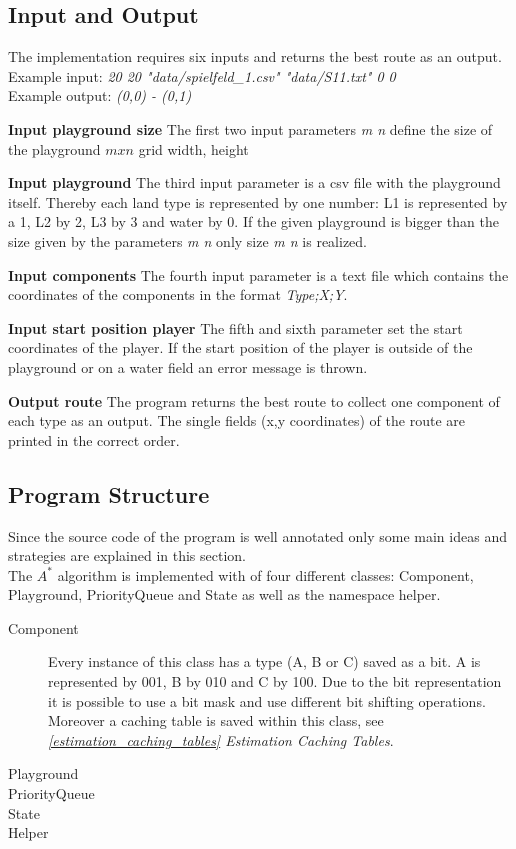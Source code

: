 \documentclass{article}
\begin{document}
\subsection{Input and Output}
The implementation requires six inputs and returns the best route as an output.\\
Example input: \textit{20 20 "data/spielfeld\_1.csv" "data/S11.txt" 0 0}\\
Example output: \textit{(0,0) - (0,1)}
\begin{description}
    \item{\textbf{Input playground size}} The first two input parameters \textit{m n} define the size of the playground $m x n$ grid width, height
    \item{\textbf{Input playground}} The third input parameter is a csv file with the playground itself. Thereby each land type is represented by one number: L1 is represented by a 1, L2 by 2, L3 by 3 and water by 0. If the given playground is bigger than the size given by the parameters \textit{m n} only size \textit{m n} is realized.
    \item{\textbf{Input components}} The fourth input parameter is a text file which contains the coordinates of the components in the format \textit{Type;X;Y}.
    \item{\textbf{Input start position player}} The fifth and sixth parameter set the start coordinates of the player. If the start position of the player is outside of the playground or on a water field an error message is thrown.
    \item{\textbf{Output route}} The program returns the best route to collect one component of each type as an output. The single fields (x,y coordinates) of the route are printed in the correct order.
\end{description}

\subsection{Program Structure}
Since the source code of the program is well annotated only some main ideas and strategies are explained in this section.\\
The $A^*$ algorithm is implemented with of four different classes: Component, Playground, PriorityQueue and State as well as the namespace helper. 

\begin{description}
    \item[Component] Every instance of this class has a type (A, B or C) saved as a bit. A is represented by 001, B by 010 and C by 100. Due to the bit representation it is possible to use a bit mask and use different bit shifting operations. Moreover a caching table is saved within this class, see \textit{\ref{estimation_caching_tables} Estimation Caching Tables}.
    \item[Playground]
    \item[PriorityQueue]
    \item[State]
    \item[Helper]
\end{description}
\end{document}
